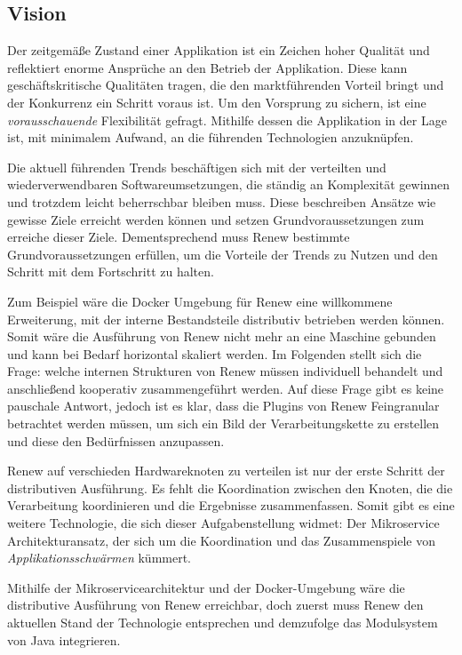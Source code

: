 \subsection{Vision} \label{sub:moderner_zustand}
	Der zeitgemäße Zustand einer Applikation ist ein Zeichen hoher Qualität und reflektiert enorme Ansprüche an den Betrieb der Applikation. Diese kann geschäftskritische Qualitäten tragen, die den marktführenden Vorteil bringt und der Konkurrenz ein Schritt voraus ist. Um den Vorsprung zu sichern, ist eine \textit{vorausschauende} Flexibilität gefragt. Mithilfe dessen die Applikation in der Lage ist, mit minimalem Aufwand, an die führenden Technologien anzuknüpfen. 

	Die aktuell führenden Trends beschäftigen sich mit der verteilten und wiederverwendbaren Softwareumsetzungen, die ständig an Komplexität gewinnen und trotzdem leicht beherrschbar bleiben muss. Diese beschreiben Ansätze wie gewisse Ziele erreicht werden können und setzen Grundvoraussetzungen zum erreiche dieser Ziele. Dementsprechend muss Renew bestimmte Grundvoraussetzungen erfüllen, um die Vorteile der Trends zu Nutzen und den Schritt mit dem Fortschritt zu halten.  \bigbreak

	Zum Beispiel wäre die Docker Umgebung für Renew eine willkommene Erweiterung, mit der interne Bestandsteile distributiv betrieben werden können. Somit wäre die Ausführung von Renew nicht mehr an eine Maschine gebunden und kann bei Bedarf horizontal skaliert werden. Im Folgenden stellt sich die Frage: welche internen Strukturen von Renew müssen individuell behandelt und anschließend kooperativ zusammengeführt werden. Auf diese Frage gibt es keine pauschale Antwort, jedoch ist es klar, dass die Plugins von Renew Feingranular betrachtet werden müssen, um sich ein Bild der Verarbeitungskette zu erstellen und diese den Bedürfnissen anzupassen. \bigbreak

	Renew auf verschieden Hardwareknoten zu verteilen ist nur der erste Schritt der distributiven Ausführung. Es fehlt die Koordination zwischen den Knoten, die die Verarbeitung koordinieren und die Ergebnisse zusammenfassen. Somit gibt es eine weitere Technologie, die sich dieser Aufgabenstellung widmet: Der Mikroservice Architekturansatz, der sich um die Koordination und das Zusammenspiele von \textit{Applikationsschwärmen} kümmert. \bigbreak

	Mithilfe der Mikroservicearchitektur und der Docker-Umgebung wäre die distributive Ausführung von Renew erreichbar, doch zuerst muss Renew den aktuellen Stand der Technologie entsprechen und demzufolge das Modulsystem von Java integrieren.  


